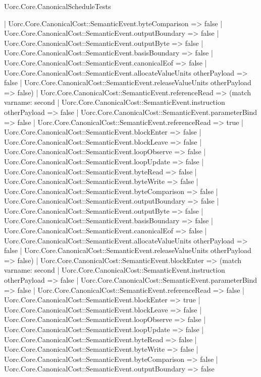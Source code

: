 \begin{lexlean}{Uorc.Core.CanonicalScheduleTests}
\begin{semanticmodule}
{      | Uorc.Core.CanonicalCost::SemanticEvent.byteComparison => false
      | Uorc.Core.CanonicalCost::SemanticEvent.outputBoundary => false
      | Uorc.Core.CanonicalCost::SemanticEvent.outputByte => false
      | Uorc.Core.CanonicalCost::SemanticEvent.basisBoundary => false
      | Uorc.Core.CanonicalCost::SemanticEvent.canonicalEof => false
      | Uorc.Core.CanonicalCost::SemanticEvent.allocateValueUnits otherPayload => false
      | Uorc.Core.CanonicalCost::SemanticEvent.releaseValueUnits otherPayload => false)
    | Uorc.Core.CanonicalCost::SemanticEvent.referenceRead => (match var{name: second}
      | Uorc.Core.CanonicalCost::SemanticEvent.instruction otherPayload => false
      | Uorc.Core.CanonicalCost::SemanticEvent.parameterBind => false
      | Uorc.Core.CanonicalCost::SemanticEvent.referenceRead => true
      | Uorc.Core.CanonicalCost::SemanticEvent.blockEnter => false
      | Uorc.Core.CanonicalCost::SemanticEvent.blockLeave => false
      | Uorc.Core.CanonicalCost::SemanticEvent.loopObserve => false
      | Uorc.Core.CanonicalCost::SemanticEvent.loopUpdate => false
      | Uorc.Core.CanonicalCost::SemanticEvent.byteRead => false
      | Uorc.Core.CanonicalCost::SemanticEvent.byteWrite => false
      | Uorc.Core.CanonicalCost::SemanticEvent.byteComparison => false
      | Uorc.Core.CanonicalCost::SemanticEvent.outputBoundary => false
      | Uorc.Core.CanonicalCost::SemanticEvent.outputByte => false
      | Uorc.Core.CanonicalCost::SemanticEvent.basisBoundary => false
      | Uorc.Core.CanonicalCost::SemanticEvent.canonicalEof => false
      | Uorc.Core.CanonicalCost::SemanticEvent.allocateValueUnits otherPayload => false
      | Uorc.Core.CanonicalCost::SemanticEvent.releaseValueUnits otherPayload => false)
    | Uorc.Core.CanonicalCost::SemanticEvent.blockEnter => (match var{name: second}
      | Uorc.Core.CanonicalCost::SemanticEvent.instruction otherPayload => false
      | Uorc.Core.CanonicalCost::SemanticEvent.parameterBind => false
      | Uorc.Core.CanonicalCost::SemanticEvent.referenceRead => false
      | Uorc.Core.CanonicalCost::SemanticEvent.blockEnter => true
      | Uorc.Core.CanonicalCost::SemanticEvent.blockLeave => false
      | Uorc.Core.CanonicalCost::SemanticEvent.loopObserve => false
      | Uorc.Core.CanonicalCost::SemanticEvent.loopUpdate => false
      | Uorc.Core.CanonicalCost::SemanticEvent.byteRead => false
      | Uorc.Core.CanonicalCost::SemanticEvent.byteWrite => false
      | Uorc.Core.CanonicalCost::SemanticEvent.byteComparison => false
      | Uorc.Core.CanonicalCost::SemanticEvent.outputBoundary => false
}
\end{semanticmodule}
\end{lexlean}
